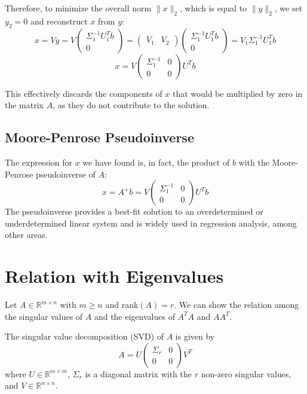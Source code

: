 Therefore, to minimize the overall norm $\| x \|_2$, which is equal to $\| y \|_2$, we set $y_2 = 0$ and reconstruct $x$ from $y$:
\[ x = Vy = V\begin{pmatrix} \Sigma_1^{-1} U_1^T b \\ 0 \end{pmatrix} = \begin{pmatrix} V_1 & V_2 \end{pmatrix} \begin{pmatrix} \Sigma_1^{-1} U_1^T b \\ 0 \end{pmatrix} = V_1 \Sigma_1^{-1} U_1^T b \]
\[ x = V \begin{pmatrix} \Sigma_1^{-1} & 0 \\ 0 & 0 \end{pmatrix} U^T b \]

This effectively discards the components of $x$ that would be multiplied by zero in the matrix $A$, as they do not contribute to the solution.

\subsection*{Moore-Penrose Pseudoinverse}
The expression for $x$ we have found is, in fact, the product of $b$ with the Moore-Penrose pseudoinverse of $A$:
\[
x = A^+ b = V \begin{pmatrix} \Sigma_1^{-1} & 0 \\ 0 & 0 \end{pmatrix} U^T b
\]
The pseudoinverse provides a best-fit solution to an overdetermined or underdetermined linear system and is widely used in regression analysis, among other areas.

\section{Relation with Eigenvalues}

Let $ A \in \mathbb{R}^{m \times n} $ with $ m \geq n $ and rank$(A) = r$. We can show the relation among the singular values of $A$ and the eigenvalues of $A^TA$ and $AA^T$.

The singular value decomposition (SVD) of $A$ is given by
\[ A = U \begin{pmatrix}
\Sigma_r & 0 \\
0 & 0 
\end{pmatrix} V^T \]
where $ U \in \mathbb{R}^{m \times m} $, $\Sigma_r$ is a diagonal matrix with the $r$ non-zero singular values, and $ V \in \mathbb{R}^{n \times n} $.

